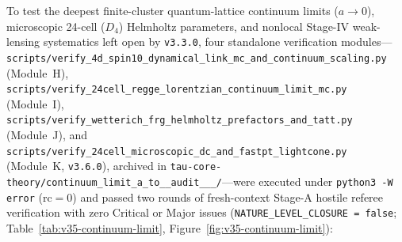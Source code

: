 \documentclass[11pt,a4paper]{article}
\begin{document}
To test the deepest finite-cluster quantum-lattice continuum limits ($a \to 0$), microscopic 24-cell ($D_4$) Helmholtz parameters, and nonlocal Stage-IV weak-lensing systematics left open by \texttt{v3.3.0}, four standalone verification modules---\texttt{scripts/\allowbreak verify\_\allowbreak 4d\_\allowbreak spin10\_\allowbreak dynamical\_\allowbreak link\_\allowbreak mc\_\allowbreak and\_\allowbreak continuum\_\allowbreak scaling.py} (Module~H), \texttt{scripts/\allowbreak verify\_\allowbreak 24cell\_\allowbreak regge\_\allowbreak lorentzian\_\allowbreak continuum\_\allowbreak limit\_\allowbreak mc.py} (Module~I), \texttt{scripts/\allowbreak verify\_\allowbreak wetterich\_\allowbreak frg\_\allowbreak helmholtz\_\allowbreak prefactors\_\allowbreak and\_\allowbreak tatt.py} (Module~J), and \texttt{scripts/\allowbreak verify\_\allowbreak 24cell\_\allowbreak microscopic\_\allowbreak dc\_\allowbreak and\_\allowbreak fastpt\_\allowbreak lightcone.py} (Module~K, \texttt{v3.6.0}), archived in \texttt{tau-core-theory/\allowbreak continuum\_\allowbreak limit\_\allowbreak a\_\allowbreak to\_\_\allowbreak audit\_\_\_/}---were executed under \texttt{python3 -W error} ($\mathrm{rc}=0$) and passed two rounds of fresh-context Stage-A hostile referee verification with zero Critical or Major issues (\texttt{NATURE\_\allowbreak LEVEL\_\allowbreak CLOSURE = false}; Table~\ref{tab:v35-continuum-limit}, Figure~\ref{fig:v35-continuum-limit}):
\end{document}
